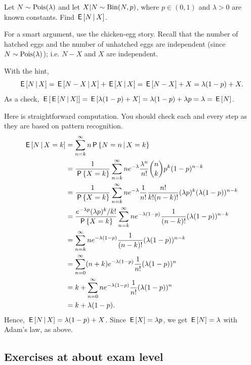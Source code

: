 \documentclass[assignments]{subfiles}
\begin{document}
\begin{exercise}
Let $N \sim \mathrm{Pois}(\lambda)$ and let  $X|N \sim \mathrm{Bin}(N, p)$, where $p \in (0,1)$ and $\lambda > 0$ are known constants. Find $\,\mathsf{E}\left[N \,\middle|\, X\right]$.
\begin{hint}
  For a smart argument, use the chicken-egg story.
  Recall that the number of hatched eggs and the number of unhatched eggs are independent (since $N \sim \mathrm{Pois}(\lambda)$); i.e.
  $N-X$ and $X$ are independent.
\end{hint}
\begin{solution}
With the hint,
\begin{equation*} \,\mathsf{E}\left[N \,\middle|\, X\right] = \,\mathsf{E}\left[N-X \,\middle|\, X\right] + \,\mathsf{E}\left[X \,\middle|\, X\right] = \,\mathsf{E}\left[N-X\right] + X = \lambda(1-p) + X. \end{equation*}
As a check, $\,\mathsf{E}\left[ \,\mathsf{E}\left[N \,\middle|\, X\right]\right] = \,\mathsf{E}\left[\lambda(1-p) + X\right] = \lambda(1-p)  + \lambda p = \lambda  = \,\mathsf{E}\left[N\right]$.

Here is straightforward computation.
You should check each and every step as they are based on pattern recognition.
\begin{align}
  \label{eq:22}
\,\mathsf{E}\left[N \,\middle|\, X=k\right]
&= \sum_{n=k}^{\infty} n \,\mathsf{P}\left\{N=n \,\middle|\, X=k \right\} \\
&= \frac{1}{\,\mathsf{P}\left\{X=k\right\}} \sum_{n=k}^{\infty} n e^{-\lambda}\frac{\lambda^{n}}{n!} {n \choose k} p^{k}(1-p)^{n-k} \\
&= \frac{1}{\,\mathsf{P}\left\{X=k\right\}}\sum_{n=k}^{\infty} n e^{-\lambda}\frac{1}{n!} \frac{n!}{k!(n-k)!}(\lambda p)^{k}(\lambda(1-p))^{n-k} \\
&= \frac{e^{-\lambda p} (\lambda p)^{k}/k!}{\,\mathsf{P}\left\{X=k\right\}}\sum_{n=k}^{\infty} n e^{-\lambda(1-p)}\frac{1}{(n-k)!}(\lambda(1-p))^{n-k} \\
&= \sum_{n=k}^{\infty} n e^{-\lambda(1-p)}\frac{1}{(n-k)!}(\lambda(1-p))^{n-k} \\
&= \sum_{n=0}^{\infty} (n+k) e^{-\lambda(1-p)}\frac{1}{n!}(\lambda(1-p))^{n} \\
&= k  + \sum_{n=0}^{\infty} n e^{-\lambda(1-p)}\frac{1}{n!}(\lambda(1-p))^{n} \\
&= k  + \lambda (1-p).
\end{align}
Hence, $\,\mathsf{E}\left[N\,\middle|\, X\right]= \lambda(1-p) + X$. Since $\,\mathsf{E}\left[X\right] = \lambda p$, we get $\,\mathsf{E}\left[N\right] = \lambda$ with Adam's law, as above.
\end{solution}
\end{exercise}



\subsection{Exercises at about exam level}
\end{document}
